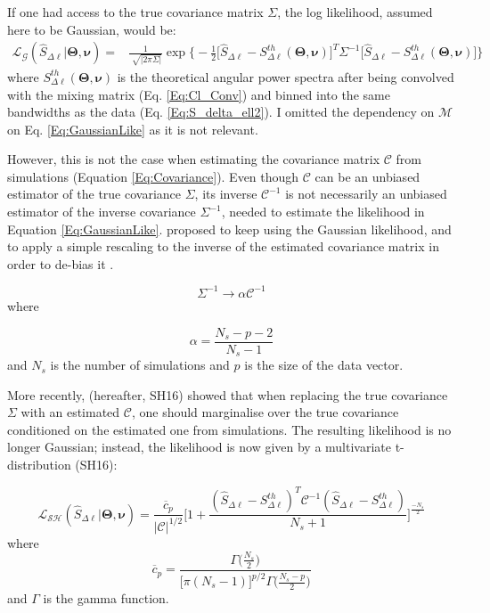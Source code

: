 \qquad If one had access to the true covariance matrix $\Sigma$, the log likelihood, assumed here to be Gaussian, would be:
\begin{align}
\mathcal{L_G}(\hat{S}_{\Delta\ell}|\pmb{\Theta}, \pmb{\nu}) = & \frac{1}{\sqrt[]{\vert 2\pi \Sigma \vert}} \exp\bigg\{ - \frac{1}{2} \big[ \hat{S}_{\Delta\ell} - S^{th}_{\Delta\ell}(\pmb{\Theta}, \pmb{\nu})\big]^T \Sigma^{-1} \big[ \hat{S}_{\Delta\ell} - S^{th}_{\Delta\ell}(\pmb{\Theta}, \pmb{\nu})\big]\bigg\}
\label{Eq:GaussianLike}
\end{align}
where $S^{th}_{\Delta\ell}(\pmb{\Theta}, \pmb{\nu})$ is the theoretical angular power spectra after being convolved with the mixing matrix (Eq. \eqref{Eq:Cl_Conv}) and binned into the same bandwidths as the data (Eq. \eqref{Eq:S_delta_ell2}). I omitted the  dependency on $\mathcal{M}$ on Eq. \eqref{Eq:GaussianLike} as it is not relevant.

\qquad However, this is not the case when estimating the covariance matrix $\mathcal{C}$ from simulations (Equation \ref{Eq:Covariance}). Even though $\mathcal{C}$ can be an unbiased estimator of the true covariance $\Sigma$, its inverse $\mathcal{C}^{-1}$ is not necessarily an unbiased estimator of the inverse covariance $\Sigma^{-1}$, needed to estimate the likelihood in Equation \eqref{Eq:GaussianLike}. \cite{Hartlap2007} proposed to keep using the Gaussian likelihood, and to apply a simple rescaling to the inverse of the estimated covariance matrix in order to de-bias it \citep{AndersonBook}.

\begin{equation}
\Sigma^{-1} \rightarrow \alpha \mathcal{C}^{-1}
\end{equation}
where 

\begin{equation}
\alpha = \frac{N_s - p - 2}{N_s - 1}
\end{equation}
and $N_s$ is the number of simulations and $p$ is the size of the data vector. 

\qquad More recently, \cite{2016SellentinHeavens} (hereafter, SH16) showed that when replacing the true covariance $\Sigma$ with an estimated $\mathcal{C}$, one should marginalise over the true covariance conditioned on the estimated one from simulations.  The resulting likelihood is no longer Gaussian; instead, the likelihood is now given by a multivariate t-distribution (SH16):

\begin{equation}
\mathcal{L_{SH}}(\hat{S}_{\Delta\ell}|\pmb{\Theta}, \pmb{\nu}) = \frac{\overline{c}_p}{\vert \mathcal{C} \vert^{1/2}} \Big[1 + \frac{(\hat{S}_{\Delta\ell} - S^{th}_{\Delta\ell})^T \mathcal{C}^{-1} (\hat{S}_{\Delta\ell} - S^{th}_{\Delta\ell})}{N_s + 1}\Big]^{\frac{-N_s}{2}}
\end{equation}
where
\begin{equation}
\overline{c}_p = \frac{\Gamma\big(\frac{N_s}{2}\big)}{\big[\pi(N_s - 1)\big]^{p/2} \Gamma\big(\frac{N_s - p}{2}\big)}
\end{equation}
and $\Gamma$ is the gamma function.

